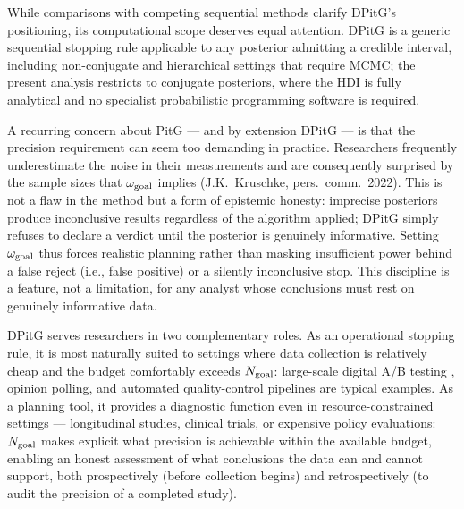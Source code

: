 While comparisons with competing sequential methods clarify DPitG's positioning,
its computational scope deserves equal attention.
DPitG is a generic sequential stopping rule applicable to any posterior admitting a
credible interval, including non-conjugate and hierarchical settings that require MCMC;
the present analysis restricts to conjugate posteriors, where the HDI is fully
analytical and no specialist probabilistic programming software is required.


A recurring concern about PitG --- and by extension DPitG --- is that the precision
requirement can seem too demanding in practice.
Researchers frequently underestimate the noise in their measurements and are consequently surprised by the sample sizes that
$\omega_{\rm goal}$ implies (J.K.\ Kruschke, pers.\ comm.\ 2022). This is not a flaw
in the method but a form of epistemic honesty: imprecise posteriors produce inconclusive
results regardless of the algorithm applied; DPitG simply refuses to declare a verdict
until the posterior is genuinely informative. Setting $\omega_{\rm goal}$ thus forces
realistic planning rather than masking insufficient power behind a false reject (i.e., false positive) or a
silently inconclusive stop.
This discipline is a feature, not a limitation, for any analyst whose conclusions
must rest on genuinely informative data.

DPitG serves researchers in two complementary roles.
As an operational stopping rule, it is most naturally suited to settings where data
collection is relatively cheap and the budget comfortably exceeds $N_{\rm goal}$:
large-scale digital A/B testing \citep{johari2022}, opinion polling, and automated
quality-control pipelines are typical examples.
As a planning tool, it provides a diagnostic function even in resource-constrained
settings --- longitudinal studies, clinical trials, or expensive policy evaluations:
$N_{\rm goal}$ makes explicit what precision is achievable within the available budget,
enabling an honest assessment of what conclusions the data can and cannot support,
both prospectively (before collection begins) and retrospectively (to audit the
precision of a completed study).

